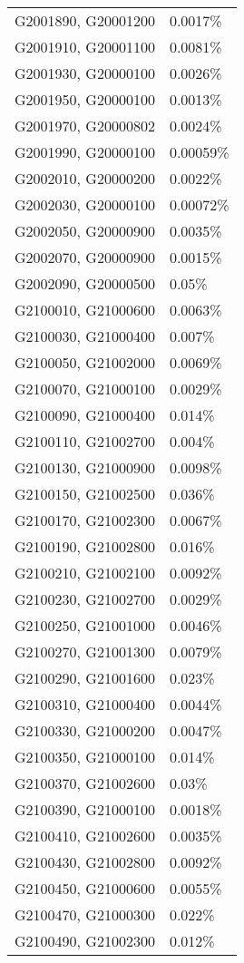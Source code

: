 \begin{longtable}[]{@{}ll@{}}
G2001890, G20001200 & 0.0017\% \\
G2001910, G20001100 & 0.0081\% \\
G2001930, G20000100 & 0.0026\% \\
G2001950, G20000100 & 0.0013\% \\
G2001970, G20000802 & 0.0024\% \\
G2001990, G20000100 & 0.00059\% \\
G2002010, G20000200 & 0.0022\% \\
G2002030, G20000100 & 0.00072\% \\
G2002050, G20000900 & 0.0035\% \\
G2002070, G20000900 & 0.0015\% \\
G2002090, G20000500 & 0.05\% \\
G2100010, G21000600 & 0.0063\% \\
G2100030, G21000400 & 0.007\% \\
G2100050, G21002000 & 0.0069\% \\
G2100070, G21000100 & 0.0029\% \\
G2100090, G21000400 & 0.014\% \\
G2100110, G21002700 & 0.004\% \\
G2100130, G21000900 & 0.0098\% \\
G2100150, G21002500 & 0.036\% \\
G2100170, G21002300 & 0.0067\% \\
G2100190, G21002800 & 0.016\% \\
G2100210, G21002100 & 0.0092\% \\
G2100230, G21002700 & 0.0029\% \\
G2100250, G21001000 & 0.0046\% \\
G2100270, G21001300 & 0.0079\% \\
G2100290, G21001600 & 0.023\% \\
G2100310, G21000400 & 0.0044\% \\
G2100330, G21000200 & 0.0047\% \\
G2100350, G21000100 & 0.014\% \\
G2100370, G21002600 & 0.03\% \\
G2100390, G21000100 & 0.0018\% \\
G2100410, G21002600 & 0.0035\% \\
G2100430, G21002800 & 0.0092\% \\
G2100450, G21000600 & 0.0055\% \\
G2100470, G21000300 & 0.022\% \\
G2100490, G21002300 & 0.012\% \\

\end{longtable}

